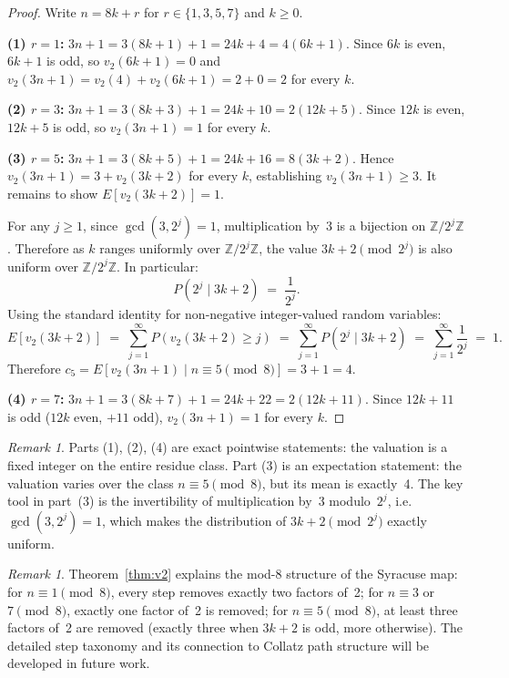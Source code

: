 \documentclass[12pt]{article}
\theoremstyle{definition}
\theoremstyle{remark}
\newtheorem{remark}[theorem]{Remark}
\newcommand{\vt}{v_2}
\begin{document}
\begin{proof}
Write $n = 8k + r$ for $r \in \{1,3,5,7\}$ and $k \geq 0$.

\medskip\noindent
\textbf{(1) $r = 1$:} $3n+1 = 3(8k+1)+1 = 24k+4 = 4(6k+1)$.
Since $6k$ is even, $6k+1$ is odd, so $\vt(6k+1) = 0$ and
$\vt(3n+1) = \vt(4) + \vt(6k+1) = 2 + 0 = 2$ for every $k$.

\medskip\noindent
\textbf{(2) $r = 3$:} $3n+1 = 3(8k+3)+1 = 24k+10 = 2(12k+5)$.
Since $12k$ is even, $12k+5$ is odd, so $\vt(3n+1) = 1$ for every $k$.

\medskip\noindent
\textbf{(3) $r = 5$:} $3n+1 = 3(8k+5)+1 = 24k+16 = 8(3k+2)$.
Hence $\vt(3n+1) = 3 + \vt(3k+2)$ for every $k$, establishing $\vt(3n+1) \geq 3$.
It remains to show $E[\vt(3k+2)] = 1$.

For any $j \geq 1$, since $\gcd(3, 2^j) = 1$, multiplication by~3 is a
bijection on $\mathbb{Z}/2^j\mathbb{Z}$. Therefore as $k$ ranges uniformly
over $\mathbb{Z}/2^j\mathbb{Z}$, the value $3k+2 \pmod{2^j}$ is also uniform
over $\mathbb{Z}/2^j\mathbb{Z}$. In particular:
\[
  P\!\left(2^j \mid 3k+2\right) \;=\; \frac{1}{2^j}.
\]
Using the standard identity for non-negative integer-valued random variables:
\[
  E[\vt(3k+2)] \;=\; \sum_{j=1}^{\infty} P\!\left(\vt(3k+2) \geq j\right)
  \;=\; \sum_{j=1}^{\infty} P\!\left(2^j \mid 3k+2\right)
  \;=\; \sum_{j=1}^{\infty} \frac{1}{2^j} \;=\; 1.
\]
Therefore $c_5 = E[\vt(3n+1) \mid n \equiv 5 \pmod{8}] = 3 + 1 = 4$.

\medskip\noindent
\textbf{(4) $r = 7$:} $3n+1 = 3(8k+7)+1 = 24k+22 = 2(12k+11)$.
Since $12k+11$ is odd ($12k$ even, $+11$ odd), $\vt(3n+1) = 1$ for every $k$.
\end{proof}

\begin{remark}
Parts (1), (2), (4) are exact pointwise statements: the valuation is a fixed
integer on the entire residue class. Part (3) is an expectation statement: the
valuation varies over the class $n \equiv 5 \pmod{8}$, but its mean is exactly~4.
The key tool in part~(3) is the invertibility of multiplication by~3 modulo~$2^j$,
i.e.\ $\gcd(3, 2^j) = 1$, which makes the distribution of $3k+2 \pmod{2^j}$
exactly uniform.
\end{remark}

\begin{remark}
Theorem~\ref{thm:v2} explains the mod-8 structure of the Syracuse map:
for $n \equiv 1 \pmod{8}$, every step removes exactly two factors of~2;
for $n \equiv 3$ or $7 \pmod{8}$, exactly one factor of~2 is removed;
for $n \equiv 5 \pmod{8}$, at least three factors of~2 are removed (exactly
three when $3k+2$ is odd, more otherwise).
The detailed step taxonomy and its connection to Collatz path structure
will be developed in future work.
\end{remark}
\end{document}
